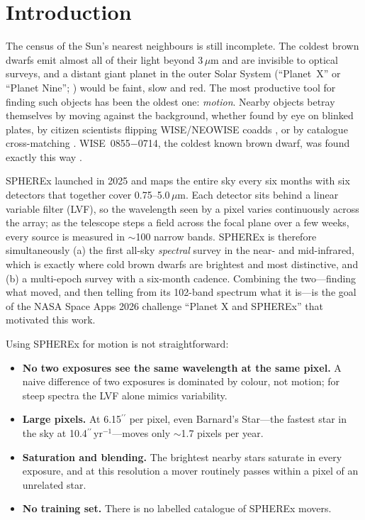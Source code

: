 \documentclass[10pt,twocolumn]{article}
\newcommand{\asec}{\ensuremath{^{\prime\prime}}}
\newcommand{\asecyr}{\ensuremath{^{\prime\prime}\,\mathrm{yr}^{-1}}}
\newcommand{\um}{\ensuremath{\mu\mathrm{m}}}
\newcommand{\wise}{WISE~0855$-$0714}
\begin{document}
\section{Introduction}
\label{sec:intro}

The census of the Sun's nearest neighbours is still incomplete. The coldest brown dwarfs emit almost
all of their light beyond 3\,\um{} and are invisible to optical surveys, and a distant giant planet in the
outer Solar System (``Planet~X'' or ``Planet Nine'';
\citealt{batygin2016}) would be faint, slow and red. The most productive tool for finding such objects has
been the oldest one: \emph{motion}. Nearby objects betray themselves by moving against the background,
whether found by eye on blinked plates, by citizen scientists flipping WISE/NEOWISE coadds
\citep{kuchner2017,meisner2018}, or by catalogue cross-matching \citep{kirkpatrick2021}.
\wise{}, the coldest known brown dwarf, was found exactly this way \citep{luhman2014}.

SPHEREx \citep{dore2014,crill2020} launched in 2025 and maps the entire sky every six months with
six detectors that together cover 0.75--5.0\,\um{}. Each detector sits behind a linear variable filter
(LVF), so the wavelength seen by a pixel varies continuously across the array; as the telescope steps a
field across the focal plane over a few weeks, every source is measured in $\sim$100 narrow bands.
SPHEREx is therefore simultaneously (a) the first all-sky \emph{spectral} survey in the near- and
mid-infrared, which is exactly where cold brown dwarfs are brightest and most distinctive, and
(b) a multi-epoch survey with a six-month cadence. Combining the two---finding what moved, and then
telling from its 102-band spectrum what it is---is the goal of the NASA Space Apps 2026 challenge
``Planet X and SPHEREx'' that motivated this work.

Using SPHEREx for motion is not straightforward:
\begin{itemize}
  \item \textbf{No two exposures see the same wavelength at the same pixel.} A naive difference of two
        exposures is dominated by colour, not motion; for steep spectra the LVF alone mimics variability.
  \item \textbf{Large pixels.} At 6.15\asec{} per pixel, even Barnard's Star---the fastest star in the
        sky at 10.4\asecyr---moves only $\sim$1.7 pixels per year.
  \item \textbf{Saturation and blending.} The brightest nearby stars saturate in every exposure, and at
        this resolution a mover routinely passes within a pixel of an unrelated star.
  \item \textbf{No training set.} There is no labelled catalogue of SPHEREx movers.
\end{itemize}
\end{document}
